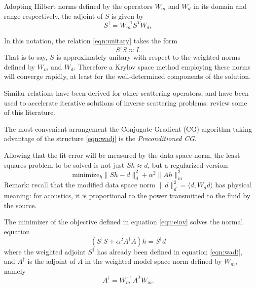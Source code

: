 Adopting Hilbert norms defined by the operators $W_m$ and $W_d$ in its
domain and range respectively, the adjoint of $S$ is given by
\begin{equation}
\label{eqn:wadj}
S^{\dagger} = W_m^{-1}S^TW_d,
\end{equation}

In this notation, the relation \ref{eqn:unitary} takes the form
\begin{equation}
  \label{eqn:wunitary}
  S^{\dagger}S \approx I.
\end{equation}
That is to say, $S$ is approximately unitary with respect to the
weighted norms defined by $W_m$ and $W_d$. Therefore a Krylov space
method employing these norms will converge rapidly, at least for the
well-determined components of the solution.

Similar relations have been derived for other scattering operators,  
and have been used to accelerate iterative solutions of inverse  
scattering problems: \cite{DafniSymes:SEG18b} review some of this  
literature. 
 
The most convenient arrangement the Conjugate Gradient (CG) algorithm
taking advantage of the structure \ref{eqn:wadj} is the {\em
  Preconditioned CG}. 

Allowing that the fit error will be measured by the data space norm,
the least squares problem to be solved is not just $Sh \approx d$, but
a regularized version:
\begin{equation}
  \label{eqn:einv}
  \mbox{minimize}_h \|Sh-d\|^2_d + \alpha^2 \|Ah\|^2_m
\end{equation}
Remark: recall that the modified data space norm $\|d\|_d^2 = \langle
d, W_d d\rangle$ has physical meaning: for acoustics, it is
proportional to the power transmitted to the fluid by the source.

The minimizer of the objective defined in equation \ref{eqn:einv}
solves the normal equation
\begin{equation}
  \label{eqn:norm0}
  (S^{\dagger}S + \alpha^2 A^{\dagger}A)h = S^{\dagger}d 
\end{equation}
where the weighted adjoint $S^{\dagger}$ has already been defined in equation \ref{eqn:wadj}, and $A^{\dagger}$ is the adjoint of $A$ in the weighted model space norm defined by $W_m$, namely
\begin{equation}
  \label{eqn:aadj}
  A^{\dagger} = W_m^{-1}A^TW_m.
\end{equation}

